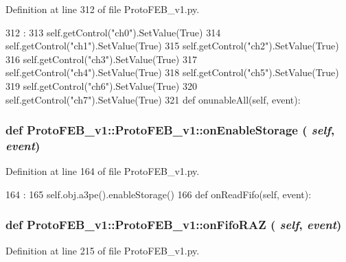 Definition at line 312 of file ProtoFEB\_\-v1.py.


\begin{DoxyCode}
312                                 :
313         self.getControl("ch0").SetValue(True)
314         self.getControl("ch1").SetValue(True)
315         self.getControl("ch2").SetValue(True)
316         self.getControl("ch3").SetValue(True)
317         self.getControl("ch4").SetValue(True)
318         self.getControl("ch5").SetValue(True)
319         self.getControl("ch6").SetValue(True)
320         self.getControl("ch7").SetValue(True)
321 
    def onunableAll(self, event):
\end{DoxyCode}
\hypertarget{classProtoFEB__v1_1_1ProtoFEB__v1_a83c1e6f881f44cd0ccd19d6df21a02f9}{
\subsubsection[{onEnableStorage}]{\setlength{\rightskip}{0pt plus 5cm}def ProtoFEB\_\-v1::ProtoFEB\_\-v1::onEnableStorage ( {\em self}, \/   {\em event})}}
\label{classProtoFEB__v1_1_1ProtoFEB__v1_a83c1e6f881f44cd0ccd19d6df21a02f9}


Definition at line 164 of file ProtoFEB\_\-v1.py.


\begin{DoxyCode}
164                                     :
165         self.obj.a3pe().enableStorage()
166 
    def onReadFifo(self, event):
\end{DoxyCode}
\hypertarget{classProtoFEB__v1_1_1ProtoFEB__v1_a321e06797a731b59488db89c496925ba}{
\subsubsection[{onFifoRAZ}]{\setlength{\rightskip}{0pt plus 5cm}def ProtoFEB\_\-v1::ProtoFEB\_\-v1::onFifoRAZ ( {\em self}, \/   {\em event})}}
\label{classProtoFEB__v1_1_1ProtoFEB__v1_a321e06797a731b59488db89c496925ba}


Definition at line 215 of file ProtoFEB\_\-v1.py.


